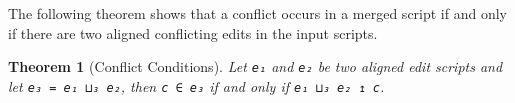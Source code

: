 \documentclass{sigplanconf}
\theoremstyle{plain}
\newtheorem{thm}{Theorem}
\begin{document}


    The following theorem shows that a conflict occurs in a merged script
    if and only if there are two aligned conflicting edits in the input scripts.
\begin{thm}[Conflict Conditions]
  Let \texttt{e₁} and \texttt{e₂} be two aligned edit scripts
  and let \texttt{e₃ = e₁ ⊔₃ e₂}, then \texttt{c ∈ e₃} if and only if
  \texttt{e₁ ⊔₃ e₂ ↥ c}.
\end{thm}



\end{document}
